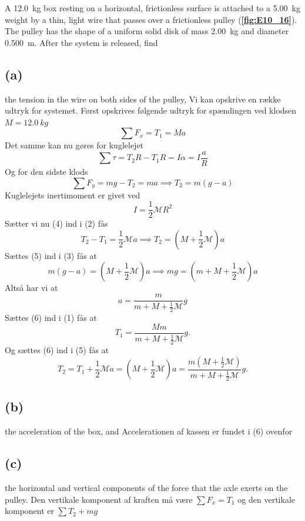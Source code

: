 \documentclass[12pt]{article}
\begin{document}
A \qty{12,0}{kg} box resting on a horizontal, frictionless surface is attached to a \qty{5,00}{kg} weight by a thin, light wire that passes over a frictionless pulley (\textbf{\autoref{fig:E10_16}}). The pulley has the shape of a uniform solid disk of mass \qty{2,00}{kg} and diameter \qty{0,500}{m}. After the system is released, find

\subsection*{(a)}
the tension in the wire on both sides of the pulley,
\bigbreak
Vi kan opskrive en række udtryk for systemet. Først opskrives følgende udtryk for spændingen ved klodsen $M = \qty{12,0}{kg}$
\begin{equation}
\sum F_x = T_1 = Ma
\end{equation}
Det samme kan nu gøres for kuglelejet
\begin{equation}
\sum \tau = T_2 R - T_1 R = I\alpha = I \frac{a}{R}
\end{equation}
Og for den sidste klods
\begin{equation}
\sum F_y = mg - T_2 = ma \implies T_2 = m(g-a)
\end{equation}
Kuglelejets inertimoment er givet ved
\begin{equation}
I = \frac{1}{2} \mathcal{M} R^2
\end{equation}
Sætter  vi nu (4) ind i (2) fås
\begin{equation}
T_2 - T_1 = \frac{1}{2}\mathcal{M} a \implies T_2 = (M + \frac{1}{2}\mathcal{M})a
\end{equation}
Sættes (5) ind i (3) fås at
\[
m(g-a) = (M + \frac{1}{2} \mathcal{M})a \implies mg = (m + M + \frac{1}{2}\mathcal{M})a
\]
Altså har vi at
\begin{equation}
a = \frac{m}{m + M + \frac{1}{2}\mathcal{M}}g
\end{equation}
Sættes (6) ind i (1) fås at
\[
T_1 = \frac{Mm}{m+M+\frac{1}{2}\mathcal{M}}g
.\] 
Og sættes (6) ind i (5) fås at
\[
T_2 = T_1 + \frac{1}{2}\mathcal{M}a = (M + \frac{1}{2}\mathcal{M})a = \frac{m(M + \frac{1}{2}\mathcal{M})}{m+M+\frac{1}{2}\mathcal{M}}g
.\] 


\subsection*{(b)}
the acceleration of the box, and
\bigbreak
Accelerationen af kassen er fundet i (6) ovenfor

\subsection*{(c)}
the horizontal and vertical components of the force that the axle exerts on the pulley.
\bigbreak
Den vertikale komponent af kraften må være $\sum F_x = T_1$ og den vertikale komponent er  $\sum T_2 + mg$
  
\end{document}
